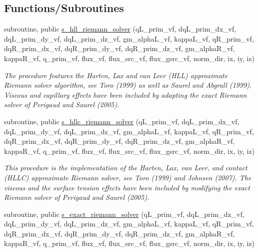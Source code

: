 \subsection*{Functions/\+Subroutines}
\begin{DoxyCompactItemize}
\item 
subroutine, public \hyperlink{namespacem__riemann__solvers_a3062ef97dfec8673afd80dcbee6e3814}{s\+\_\+hll\+\_\+riemann\+\_\+solver} (q\+L\+\_\+prim\+\_\+vf, dq\+L\+\_\+prim\+\_\+dx\+\_\+vf, dq\+L\+\_\+prim\+\_\+dy\+\_\+vf, dq\+L\+\_\+prim\+\_\+dz\+\_\+vf, gm\+\_\+alpha\+L\+\_\+vf, kappa\+L\+\_\+vf, q\+R\+\_\+prim\+\_\+vf, dq\+R\+\_\+prim\+\_\+dx\+\_\+vf, dq\+R\+\_\+prim\+\_\+dy\+\_\+vf, dq\+R\+\_\+prim\+\_\+dz\+\_\+vf, gm\+\_\+alpha\+R\+\_\+vf, kappa\+R\+\_\+vf, q\+\_\+prim\+\_\+vf, flux\+\_\+vf, flux\+\_\+src\+\_\+vf, flux\+\_\+gsrc\+\_\+vf, norm\+\_\+dir, ix, iy, iz)
\begin{DoxyCompactList}\small\item\em The procedure features the Harten, Lax and van Leer (H\+LL) approximate Riemann solver algorithm, see Toro (1999) as well as Saurel and Abgrall (1999). Viscous and capillary effects have been included by adapting the exact Riemann solver of Perigaud and Saurel (2005). \end{DoxyCompactList}\item 
subroutine, public \hyperlink{namespacem__riemann__solvers_ae2ad588d58b624a8320805f3860a3eb8}{s\+\_\+hllc\+\_\+riemann\+\_\+solver} (q\+L\+\_\+prim\+\_\+vf, dq\+L\+\_\+prim\+\_\+dx\+\_\+vf, dq\+L\+\_\+prim\+\_\+dy\+\_\+vf, dq\+L\+\_\+prim\+\_\+dz\+\_\+vf, gm\+\_\+alpha\+L\+\_\+vf, kappa\+L\+\_\+vf, q\+R\+\_\+prim\+\_\+vf, dq\+R\+\_\+prim\+\_\+dx\+\_\+vf, dq\+R\+\_\+prim\+\_\+dy\+\_\+vf, dq\+R\+\_\+prim\+\_\+dz\+\_\+vf, gm\+\_\+alpha\+R\+\_\+vf, kappa\+R\+\_\+vf, q\+\_\+prim\+\_\+vf, flux\+\_\+vf, flux\+\_\+src\+\_\+vf, flux\+\_\+gsrc\+\_\+vf, norm\+\_\+dir, ix, iy, iz)
\begin{DoxyCompactList}\small\item\em This procedure is the implementation of the Harten, Lax, van Leer, and contact (H\+L\+LC) approximate Riemann solver, see Toro (1999) and Johnsen (2007). The viscous and the surface tension effects have been included by modifying the exact Riemann solver of Perigaud and Saurel (2005). \end{DoxyCompactList}\item 
subroutine, public \hyperlink{namespacem__riemann__solvers_a9fa393b97819b253e8b85f0444a15c27}{s\+\_\+exact\+\_\+riemann\+\_\+solver} (q\+L\+\_\+prim\+\_\+vf, dq\+L\+\_\+prim\+\_\+dx\+\_\+vf, dq\+L\+\_\+prim\+\_\+dy\+\_\+vf, dq\+L\+\_\+prim\+\_\+dz\+\_\+vf, gm\+\_\+alpha\+L\+\_\+vf, kappa\+L\+\_\+vf, q\+R\+\_\+prim\+\_\+vf, dq\+R\+\_\+prim\+\_\+dx\+\_\+vf, dq\+R\+\_\+prim\+\_\+dy\+\_\+vf, dq\+R\+\_\+prim\+\_\+dz\+\_\+vf, gm\+\_\+alpha\+R\+\_\+vf, kappa\+R\+\_\+vf, q\+\_\+prim\+\_\+vf, flux\+\_\+vf, flux\+\_\+src\+\_\+vf, flux\+\_\+gsrc\+\_\+vf, norm\+\_\+dir, ix, iy, iz)

\end{DoxyCompactItemize}
